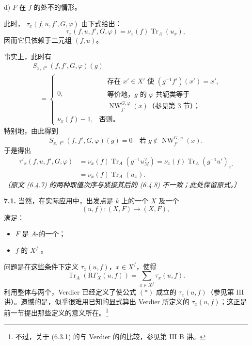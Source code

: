 \textup{d)}  $F$ 在 $f$ 的处不的情形。

此时， $\tau_x(f,u,f',G,\varphi)$ 由下式给出：
\[
\tau_x(f,u,f',G,\varphi)=\nu_x(f)\operatorname{Tr}_A(u_x),
\tag{6.4.6}
\]
因而它只依赖于二元组 $(f,u)$。

事实上，此时有
\[
\begin{aligned}
{}&S_{x,\ell^n}(f,f',G,\varphi)(g)\\
&\quad=\begin{cases}
0,&\begin{aligned}
 {}&\text{存在 }x'\in X'\text{ 使 }(g^{-1}f')(x')=x',\\[-2pt]
 &\text{等价地，}g\text{ 的 }\varphi\text{ 共轭类等于}\\[-2pt]
 &\operatorname{NW}_{f'}^{G,\varphi}(x)\text{（参见第 3 节）；}
\end{aligned}\\
\nu_x(f)-1,&\text{否则。}
\end{cases}
\end{aligned}
\tag{6.4.7}
\]
特别地，由此得到
\[
S_{x,\ell^n}(f,f',G,\varphi)(g)=0
\quad\text{若 }g\notin\operatorname{NW}_{f'}^{G,\varphi}(x).
\tag{6.4.8}
\]
于是得出
\[
\begin{aligned}
\tau'_x(f,u,f',G,\varphi)
 &=\nu_x(f)\operatorname{Tr}_A(g^{-1}u_M^\vee)
  =\nu_x(f)\operatorname{Tr}_A(g^{-1}u')_{x'}\\
 &=\nu_x(f)\operatorname{Tr}_A(u_x).
\end{aligned}
\tag{6.4.9}
\]
\textit{〔原文 (6.4.7) 的两种取值次序与紧接其后的 (6.4.8) 不一致；此处保留原式。〕}

\textbf{7.1.} 当然，在实际应用中，出发点是 $k$ 上的一个 $X$ 及一个
\[
(u,f):(X,F)\longrightarrow(X,F),
\]
满足：
\begin{itemize}
\item $F$ 是 $A$-的一个；
\item $f$ 的 $X^f$ 。
\end{itemize}
问题是在这些条件下定义 $\tau_x(u,f)$，$x\in X^f$，使得
\[
\operatorname{Tr}_A(\mathrm R\Gamma_X(u,f))
=\sum_{x\in X^f}\tau_x(u,f).
\tag{*}
\]
利用整体与两个，Verdier 已经定义了使公式 $(*)$ 成立的 $\tau_x(u,f)$（参见第 III 讲）。遗憾的是，似乎很难用已知的显式算出 Verdier 所定义的 $\tau_x(u,f)$；这正是前一节提出那些定义的意义所在。\footnote{不过，关于 (6.3.1) 的与 Verdier 的的比较，参见第 III B 讲。}

